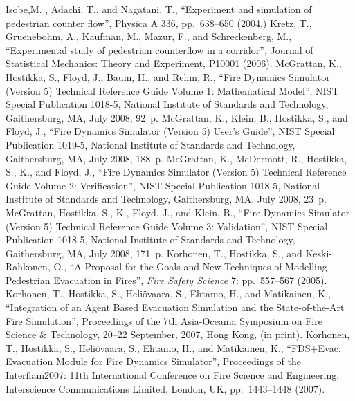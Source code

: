 \documentclass[12pt,a4paper,final,twoside]{stylevk}
\begin{document}
\renewcommand{\bibname}{References}
\begin{thebibliography}{99}
%
 Isobe,M. , Adachi, T., and Nagatani, T.,
  ``Experiment and simulation of pedestrian counter flow'', Physica A
  336, pp.\ 638--650 (2004.)
%
 Kretz, T., Gruenebohm, A., Kaufman, M., Mazur, F.,
  and Schreckenberg, M., ``Experimental study of pedestrian
  counterflow in a corridor'', Journal of Statistical Mechanics:
  Theory and Experiment, P10001 (2006).
%
 McGrattan, K., Hostikka, S., Floyd, J., Baum, H.,
  and Rehm, R., ``Fire Dynamics Simulator (Version 5) Technical
  Reference Guide Volume 1: Mathematical Model'', NIST Special
  Publication 1018-5, National Institute of Standards and
  Technology, Gaithersburg, MA, July 2008, 92~p.
%
 McGrattan, K., Klein, B., Hostikka, S., and
  Floyd, J., ``Fire Dynamics Simulator (Version 5) User's Guide'',
  NIST Special Publication 1019-5, National Institute of Standards and
  Technology, Gaithersburg, MA, July 2008, 188~p.
%
 McGrattan, K., McDermott, R., Hostikka, S., K.,
  and Floyd, J., ``Fire Dynamics Simulator (Version 5) Technical
  Reference Guide Volume 2: Verification'', NIST Special Publication
  1018-5, National Institute of Standards and Technology,
  Gaithersburg, MA, July 2008, 23~p.
%
 McGrattan, Hostikka, S., K., Floyd, J., and
  Klein, B., ``Fire Dynamics Simulator (Version 5) Technical Reference
  Guide Volume 3: Validation'', NIST Special Publication 1018-5,
  National Institute of Standards and Technology, Gaithersburg, MA,
  July 2008, 171~p.
%
 Korhonen, T., Hostikka, S., and Keski-Rahkonen,
  O., ``A Proposal for the Goals and New Techniques of Modelling
  Pedestrian Evacuation in Fires'',  \emph{Fire Safety Science} 7:
  pp.~557--567 (2005). 
%
 Korhonen, T., Hostikka, S., Heli\"ovaara, S.,
  Ehtamo, H., and Matikainen, K., ``Integration of an Agent Based
  Evacuation Simulation and the State-of-the-Art Fire Simulation'',
  Proceedings of the 7th Asia-Oceania Symposium on Fire Science \&
  Technology, 20--22 September, 2007, Hong Kong, (in print).
%
 Korhonen, T., Hostikka, S., Heli\"ovaara, S.,
  Ehtamo, H., and Matikainen, K., ``FDS+Evac: Evacuation Module for
  Fire Dynamics Simulator'', Proceedings of the Interflam2007: 11th
  International Conference on Fire Science and Engineering,
  Interscience Communications Limited, London, UK, pp.~1443--1448
  (2007).

\end{thebibliography}
\end{document}
